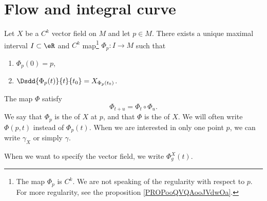 

\section{Flow and integral curve}

\begin{propositionDef}       \label{PROPooJACTooXBSxfE}
	Let \( X\) be a \( C^k\) vector field on \( M\) and let \( p\in M\). There exists a unique maximal interval \( I\subset \eR\) and \( C^k\) map\footnote{The map \( \Phi_p\) is \( C^k\). We are not speaking of the regularity with respect to \( p\). %
		For more regularity, see the proposition \ref{PROPooQVQAooJVdwOa}.} \( \Phi_p\colon I\to M\) such that
	\begin{enumerate}
		\item
		      \( \Phi_p(0)=p\),
		\item
		      \( \Dsdd{ \Phi_p(t) }{t}{t_0}=X_{\Phi_p(t_0)}\).
	\end{enumerate}
	The map \( \Phi\) satisfy
	\begin{equation}        \label{EQooCHYXooCbECRN}
		\Phi_{t+u}=\Phi_t\circ \Phi_u.
	\end{equation}
	We say that \( \Phi_p\) is the  of \( X\) at \( p\), and that \( \Phi\) is the  of \( X\). We will often write \( \Phi(p,t)\) instead of \( \Phi_p(t)\). When we are interested in only one point \( p\), we can write \( \gamma_X\) or simply \( \gamma\).

	When we want to specify the vector field, we write \( \Phi^X_g(t)\).
\end{propositionDef}

